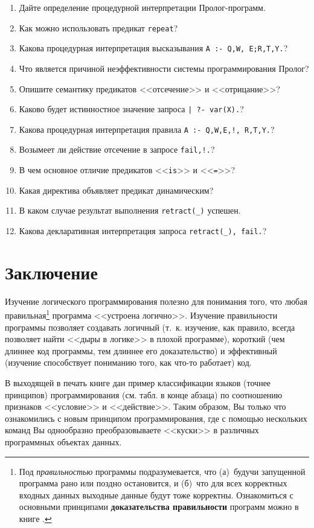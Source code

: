 \documentclass[12pt, openany, twoside]{book} %
\begin{document}
\begin{enumerate}
\item{} Дайте определение процедурной интерпретации Пролог-про\-грамм.
\item{} Как можно использовать предикат \texttt{repeat}?
\item{} Какова процедурная интерпретация высказывания \texttt{A :- Q,W, E;R,T,Y.}?
\item{} Что является причиной неэффективности системы программирования Пролог?
\item{} Опишите семантику предикатов <<отсечение>> и <<отрицание>>?
\item{} Каково будет истинностное значение запроса \texttt{| ?- var(X).}?
\item{} Какова процедурная интерпретация правила \texttt{A :- Q,W,E,!, R,T,Y.}?
\item{} Возымеет ли действие отсечение в запросе \texttt{fail,!.}?
\item{} В чем основное отличие предикатов <<\texttt{is}>> и <<\texttt{=}>>?
\item{} Какая директива объявляет предикат динамическим?
\item{} В каком случае результат выполнения \texttt{retract(\_)} успешен.
\item{} Какова декларативная интерпретация запроса \texttt{retract(\_), fail.}?
\end{enumerate}

\chapter*{Заключение}


Изучение логического программирования полезно для понимания того, что любая правильная\footnote{Под {\em правильностью} программы подразумевается, что (а)~будучи запущенной программа рано или поздно остановится, и (б)~что для всех корректных входных данных выходные данные будут тоже корректны. Ознакомиться с основными принципами {\bf доказательства правильности} программ можно в книге \cite{Anderson}.} программа <<устроена логично>>. Изучение правильности программы позволяет создавать логичный (т.~к. изучение, как правило, всегда позволяет найти <<дыры в логике>> в плохой программе), короткий (чем длиннее код программы, тем длиннее его доказательство) и эффективный (изучение способствует пониманию того, как что-то работает) код.

В выходящей в печать книге \cite{DDWII} дан пример классификации языков (точнее принципов) программирования (см. табл. в конце абзаца) по соотношению признаков <<условие>> и <<действие>>. Таким образом, Вы только что ознакомились с новым принципом программирования, где с помощью нескольких команд Вы однообразно преобразовываете <<куски>> в различных программных объектах данных.
\end{document}
